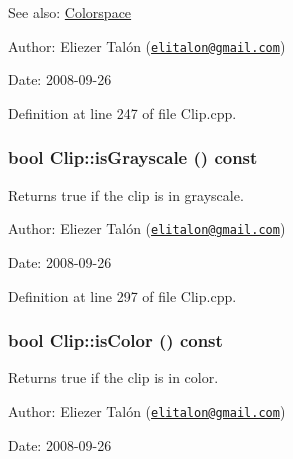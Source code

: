 \begin{Desc}
\item[See also:]\hyperlink{_colorspace_8h_7a7e24cdb2a27271343f0adceff89f65}{Colorspace}\end{Desc}
\begin{Desc}
\item[Author:]Eliezer Talón (\href{mailto:elitalon@gmail.com}{\tt elitalon@gmail.com}) \end{Desc}
\begin{Desc}
\item[Date:]2008-09-26 \end{Desc}


Definition at line 247 of file Clip.cpp.\hypertarget{class_clip_6f8d3a88f89461350228f5e7b7b9d694}{
\subsubsection[isGrayscale]{\setlength{\rightskip}{0pt plus 5cm}bool Clip::isGrayscale () const}}
\label{class_clip_6f8d3a88f89461350228f5e7b7b9d694}


Returns true if the clip is in grayscale. 

\begin{Desc}
\item[Author:]Eliezer Talón (\href{mailto:elitalon@gmail.com}{\tt elitalon@gmail.com}) \end{Desc}
\begin{Desc}
\item[Date:]2008-09-26 \end{Desc}


Definition at line 297 of file Clip.cpp.\hypertarget{class_clip_0a535167abd0a544a2de56c317bb6f3c}{
\subsubsection[isColor]{\setlength{\rightskip}{0pt plus 5cm}bool Clip::isColor () const}}
\label{class_clip_0a535167abd0a544a2de56c317bb6f3c}


Returns true if the clip is in color. 

\begin{Desc}
\item[Author:]Eliezer Talón (\href{mailto:elitalon@gmail.com}{\tt elitalon@gmail.com}) \end{Desc}
\begin{Desc}
\item[Date:]2008-09-26 \end{Desc}



